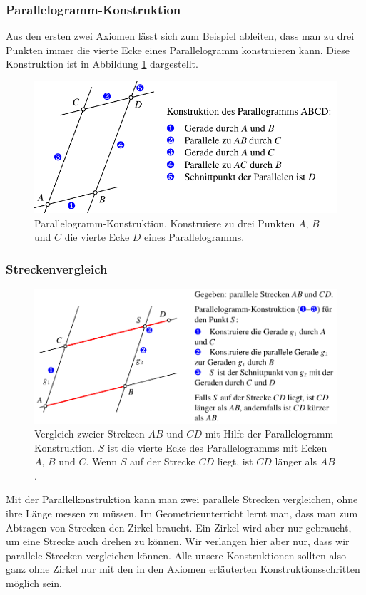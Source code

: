 \subsubsection{Parallelogramm-Konstruktion}
Aus den ersten zwei Axiomen lässt sich zum Beispiel ableiten, dass
man zu drei Punkten immer die vierte Ecke eines Parallelogramm
konstruieren kann.
Diese Konstruktion ist in Abbildung \ref{skript:affin:parallelogramm}
dargestellt.
\begin{figure}
\centering
\includegraphics{3/images/parallelogramm.pdf}
\caption{Parallelogramm-Konstruktion. Konstruiere zu drei Punkten
$A$, $B$ und $C$ die vierte Ecke $D$ eines Parallelogramms.
\label{skript:affin:parallelogramm}}
\end{figure}

\subsubsection{Streckenvergleich}
\begin{figure}
\centering
\includegraphics{3/images/streckenvergleich.pdf}
\caption{Vergleich zweier Strekcen $AB$ und $CD$ mit Hilfe der
Parallelogramm-Konstruktion. 
$S$ ist die vierte Ecke des Parallelogramms mit Ecken $A$, $B$ und $C$.
Wenn $S$ auf der Strecke $CD$ liegt, ist $CD$ länger als $AB$.
\label{skript:streckenvergleich}}
\end{figure}
Mit der Parallelkonstruktion kann man zwei parallele Strecken vergleichen,
ohne ihre Länge messen zu müssen.
Im Geometrieunterricht lernt man, dass man zum Abtragen von Strecken
den Zirkel braucht.
Ein Zirkel wird aber nur gebraucht, um eine Strecke auch drehen zu
können.
Wir verlangen hier aber nur, dass wir parallele Strecken vergleichen
können.
Alle unsere Konstruktionen sollten also ganz ohne Zirkel nur mit den
in den Axiomen erläuterten Konstruktionsschritten möglich sein.

